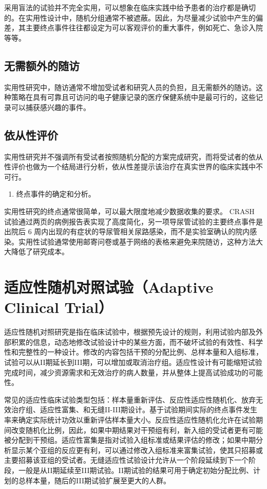 \documentclass[
  chinese-hans,
  letterpaper,
  DIV=11,
  numbers=noendperiod]{scrreprt}
\providecommand{\tightlist}{%
  \setlength{\itemsep}{0pt}\setlength{\parskip}{0pt}}
\begin{document}
采用盲法的试验并不完全实用，可以想象在临床实践中给予患者的治疗都是确切的。在实用性设计中，随机分组通常不被遮蔽。因此，为尽量减少试验中产生的偏差，其主要终点事件往往都设定为可以客观评价的重大事件，例如死亡、急诊入院等等。

\subsection{无需额外的随访}\label{ux65e0ux9700ux989dux5916ux7684ux968fux8bbf}

实用性研究中，随访通常不增加受试者和研究人员的负担，且无需额外的随访。这种策略在具有可靠且可访问的电子健康记录的医疗保健系统中是最可行的，这些记录可以捕获感兴趣的事件。

\subsection{依从性评价}\label{ux4f9dux4eceux6027ux8bc4ux4ef7}

实用性研究并不强调所有受试者按照随机分配的方案完成研究，而将受试者的依从性评价也做为一个结局进行分析，依从性差提示该治疗在真实世界的临床实践中不可行。

\begin{enumerate}
\def\labelenumi{\arabic{enumi}.}
\setcounter{enumi}{5}
\tightlist
\item
  终点事件的确定和分析。
\end{enumerate}

实用性研究的终点通常很简单，可以最大限度地减少数据收集的要求。 CRASH
试验通过两页的病例报告表实现了高度简化，另一项导尿管试验的主要终点事件是出院后
6
周内出现的有症状的导尿管相关尿路感染，而不是实验室确认的院内感染。实用性试验通常使用邮寄问卷或基于网络的表格来避免来院随访，这种方法大大降低了研究成本。

\section{适应性随机对照试验（Adaptive Clinical
Trial）}\label{ux9002ux5e94ux6027ux968fux673aux5bf9ux7167ux8bd5ux9a8cadaptive-clinical-trial}

适应性随机对照研究是指在临床试验中，根据预先设计的规则，利用试验内部及外部积累的信息，动态地修改试验设计中的某些方面，而不破坏试验的有效性、科学性和完整性的一种设计。修改的内容包括干预的分配比例、总样本量和入组标准，试验可以从II期延长到III期，可以增加或取消治疗组。适应性设计有可能缩短试验完成时间，减少资源需求和无效治疗的病人数量，并从整体上提高试验成功的可能性。

常见的适应性临床试验类型包括：样本量重新评估、反应性适应性随机化、放弃无效治疗组、适应性富集、和无缝II-III期设计。基于试验期间实际的终点事件发生率来确定实际统计功效以重新评估样本量大小。反应性适应性随机化允许在试验期间改变随机化比例，因此，如果中期结果对干预组有利，新入组的受试者更有可能被分配到干预组。适应性富集是指对试验入组标准或结果评估的修改；如果中期分析显示某个亚组的反应更有利，可以通过修改入组标准来富集试验，使其只招募或主要招募该亚组的受试者。无缝适应性试验设计允许从一个阶段延续到下一个阶段，一般是从II期延续至III期试验。II期试验的结果可用于确定初始分配比例、计划的总样本量，随后的III期试验扩展至更大的人群。
\end{document}
